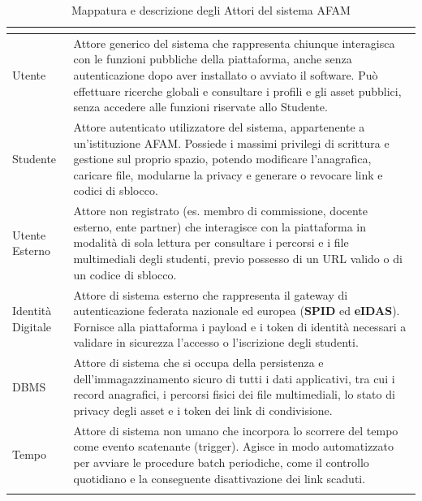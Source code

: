 \documentclass[12pt,a4paper]{article}
\begin{document}
\small
\begin{longtable}{|
>{\columncolor{unipablue}\color{white}\bfseries\raggedright\arraybackslash}p{3.4cm}|
>{\raggedright\arraybackslash}p{11.1cm}|}
\hline
\multicolumn{1}{|c|}{\cellcolor{unipablue}\color{white}\rule{0pt}{2.7ex}\textbf{ATTORE}} &
\multicolumn{1}{c|}{\rule{0pt}{2.7ex}\textbf{DESCRIZIONE}} \\
\hline
Utente & Attore generico del sistema che rappresenta chiunque interagisca con le funzioni pubbliche della piattaforma, anche senza autenticazione dopo aver installato o avviato il software. Può effettuare ricerche globali e consultare i profili e gli asset pubblici, senza accedere alle funzioni riservate allo Studente. \\ \hline
Studente & Attore autenticato utilizzatore del sistema, appartenente a un'istituzione AFAM. Possiede i massimi privilegi di scrittura e gestione sul proprio spazio, potendo modificare l'anagrafica, caricare file, modularne la privacy e generare o revocare link e codici di sblocco. \\ \hline
Utente Esterno & Attore non registrato (es. membro di commissione, docente esterno, ente partner) che interagisce con la piattaforma in modalità di sola lettura per consultare i percorsi e i file multimediali degli studenti, previo possesso di un URL valido o di un codice di sblocco. \\ \hline
Identità Digitale & Attore di sistema esterno che rappresenta il gateway di autenticazione federata nazionale ed europea (\textbf{SPID} ed \textbf{eIDAS}). Fornisce alla piattaforma i payload e i token di identità necessari a validare in sicurezza l'accesso o l'iscrizione degli studenti. \\ \hline
DBMS & Attore di sistema che si occupa della persistenza e dell'immagazzinamento sicuro di tutti i dati applicativi, tra cui i record anagrafici, i percorsi fisici dei file multimediali, lo stato di privacy degli asset e i token dei link di condivisione. \\ \hline
Tempo & Attore di sistema non umano che incorpora lo scorrere del tempo come evento scatenante (trigger). Agisce in modo automatizzato per avviare le procedure batch periodiche, come il controllo quotidiano e la conseguente disattivazione dei link scaduti. \\ \hline
\caption{Mappatura e descrizione degli Attori del sistema AFAM}
\label{tab:descrizione_attori}\\
\end{longtable}
\normalsize
\end{document}
